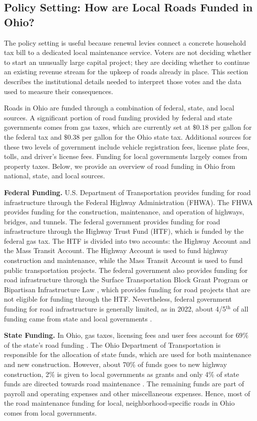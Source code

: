 \subsection{Policy Setting: How are Local Roads Funded in Ohio?}

The policy setting is useful because renewal levies connect a concrete household tax bill to a dedicated local maintenance service. Voters are not deciding whether to start an unusually large capital project; they are deciding whether to continue an existing revenue stream for the upkeep of roads already in place. This section describes the institutional details needed to interpret those votes and the data used to measure their consequences.

Roads in Ohio are funded through a combination of federal, state, and local sources. A significant portion of road funding provided by federal and state governments comes from gas taxes, which are currently set at $\$0.18$ per gallon for the federal tax and $\$0.38$ per gallon for the Ohio state tax. Additional sources for these two levels of government include vehicle registration fees, license plate fees, tolls, and driver's license fees. Funding for local governments largely comes from property taxes. Below, we provide an overview of road funding in Ohio from national, state, and local sources.

{\bf Federal Funding.} U.S. Department of Transportation provides funding for road infrastructure through the Federal Highway Administration (FHWA). The FHWA provides funding for the construction, maintenance, and operation of highways, bridges, and tunnels. The federal government provides funding for road infrastructure through the Highway Trust Fund (HTF), which is funded by the federal gas tax. The HTF is divided into two accounts: the Highway Account and the Mass Transit Account. The Highway Account is used to fund highway construction and maintenance, while the Mass Transit Account is used to fund public transportation projects. The federal government also provides funding for road infrastructure through the Surface Transportation Block Grant Program or Bipartisan Infrastructure Law \citep{USDOT_BIL_Ohio}, which provides funding for road projects that are not eligible for funding through the HTF. Nevertheless, federal government funding for road infrastructure is generally limited, as in 2022, about 4/5$^\text{th}$ of all funding came from state and local governments \citep{pgpf_htf_explained}.

{\bf State Funding.}
In Ohio, gas taxes, licensing fees and user fees account for $69\%$ of the state's road funding \citep{boesen2021}. The Ohio Department of Transportation is responsible for the allocation of state funds, which are used for both maintenance and new construction. However, about 70\% of funds goes to new highway construction, 2\% is given to local governments as grants and only 4\% of state funds are directed towards road maintenance \citep{odot2023}. The remaining funds are part of payroll and operating expenses and other miscellaneous expenses. Hence, most of the road maintenance funding for local, neighborhood-specific roads in Ohio comes from local governments.

